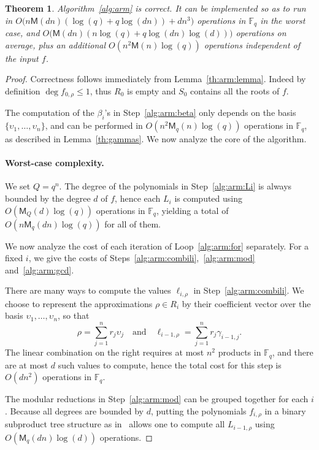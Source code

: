 \documentclass{article}
\newcommand{\ff}[1]{\mathbb{F}_{#1}}
\newcommand{\qq}{q}
\newcommand{\basef}{\ff{\qq}}
\newcommand{\Mul}{\mathsf{M}}
\newcounter{algo}
\newtheorem{Theo}{Theorem}
\begin{document}
\begin{Theo}
  \label{th:arm}
  Algorithm~\ref{alg:arm} is correct. It can be implemented so as to
  run in $O\bigl(n\Mul(dn)(\log(q) + q\log(dn)) + dn^3\bigr)$
  operations in $\basef$ in the worst case, and
  $O\bigl(\Mul(dn)(n\log(q) + q\log(dn)\log(d))\bigr)$ operations on
  average, plus an additional $O(n^2\Mul(n)\log(q))$ operations
  independent of the input $f$.
\end{Theo}
\begin{proof}
  Correctness follows immediately from
  Lemma~\ref{th:arm:lemma}. Indeed by definition
  $\deg f_{0,\rho}\le 1$, thus $R_0$ is empty and $S_0$ contains all
  the roots of $f$.

  The computation of the $\beta_i$'s in Step~\ref{alg:arm:beta} only
  depends on the basis $\{\upsilon_1,\dots,\upsilon_n\}$, and can be
  performed in $O(n^2\Mul_q(n)\log(q))$ operations in $\basef$, as
  described in Lemma~\ref{th:gammas}. We now analyze the core of the
  algorithm.

  \paragraph{Worst-case complexity.} We set $Q=q^n$.  The degree of the
  polynomials in Step~\ref{alg:arm:Li} is always bounded by the degree
  $d$ of $f$, hence each $L_i$ is computed using
  $O(\Mul_Q(d)\log(q))$ operations in $\basef$, yielding a total of
  $O(n\Mul_q(dn)\log(q))$ for all of them.

  We now analyze the cost of each iteration of Loop~\ref{alg:arm:for}
  separately. For a fixed $i$, we give the costs of
  Steps~\ref{alg:arm:combili},~\ref{alg:arm:mod}
  and~\ref{alg:arm:gcd}.

  There are many ways to compute the values $\ell_{i,\rho}$ in
  Step~\ref{alg:arm:combili}. We choose to represent the
  approximations $\rho\in R_i$ by their coefficient vector over the
  basis $\upsilon_1,\dots,\upsilon_n$, so that
  \[
    \rho = \sum_{j=1}^n r_j\upsilon_j 
    \quad\text{and}\quad
    \ell_{i-1,\rho} = \sum_{j=1}^n r_j\gamma_{i-1,j}.
  \]
  The linear combination on the right requires at most $n^2$ products
  in $\basef$, and there are at most $d$ such values to compute, hence
  the total cost for this step is $O(dn^2)$ operations in $\basef$.

  The modular reductions in Step~\ref{alg:arm:mod} can be grouped
  together for each $i$. %
  Because all degrees are bounded by $d$, putting the polynomials
  $f_{i,\rho}$ in a binary subproduct tree structure as
  in~\cite[Lemma~10.4]{Gathen2003} allows one to compute all
  $L_{i-1,\rho}$ using $O(\Mul_q(dn)\log(d))$ operations.


\end{proof}
\end{document}
